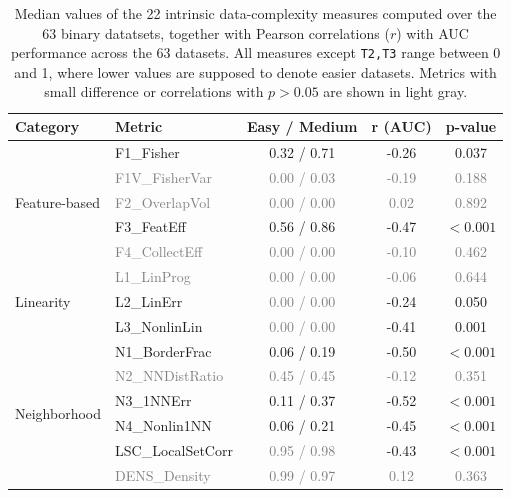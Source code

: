 \documentclass[preprint,12pt,authoryear]{elsarticle}
\begin{document}
\begin{table}[h!]
\centering
\caption{Median values of the 22 intrinsic data-complexity measures computed over the 63 binary datatsets, together with Pearson correlations ($r$) with AUC performance across the 63 datasets. 
All measures except \texttt{T2,T3} range between 0 and 1, where lower values are supposed to denote easier datasets. 
Metrics with small difference or correlations with $p > 0.05$ are shown in light gray.}
\label{tab:intrinsic_metrics_corr_preferred}
\small
\begin{tabular}{llccc}
\toprule
\textbf{Category} & \textbf{Metric} & \textbf{Easy / Medium} & \textbf{r (AUC)} & \textbf{p-value} \\
\midrule
\multirow{5}{*}{Feature-based}
 & F1\_Fisher & 0.32 / 0.71 & -0.26 & 0.037 \\
 & \textcolor{gray}{F1V\_FisherVar} & \textcolor{gray}{0.00 / 0.03} & \textcolor{gray}{-0.19} & \textcolor{gray}{0.188} \\
 & \textcolor{gray}{F2\_OverlapVol} & \textcolor{gray}{0.00 / 0.00} & \textcolor{gray}{0.02} & \textcolor{gray}{0.892} \\
 & F3\_FeatEff & 0.56 / 0.86 & -0.47 & $<0.001$ \\
 & \textcolor{gray}{F4\_CollectEff} & \textcolor{gray}{0.00 / 0.00} & \textcolor{gray}{-0.10} & \textcolor{gray}{0.462} \\
\midrule
\multirow{3}{*}{Linearity}
 & \textcolor{gray}{L1\_LinProg} & \textcolor{gray}{0.00 / 0.00} & \textcolor{gray}{-0.06} & \textcolor{gray}{0.644} \\
 & L2\_LinErr & \textcolor{gray}{0.00 / 0.00} & -0.24 & 0.050 \\
 & L3\_NonlinLin &  \textcolor{gray}{0.00 / 0.00} & -0.41 & 0.001 \\
\midrule
\multirow{6}{*}{Neighborhood}
 & N1\_BorderFrac & 0.06 / 0.19 & -0.50 & $<0.001$ \\
 & \textcolor{gray}{N2\_NNDistRatio} & \textcolor{gray}{0.45 / 0.45} & \textcolor{gray}{-0.12} & \textcolor{gray}{0.351} \\
 & N3\_1NNErr & 0.11 / 0.37 & -0.52 & $<0.001$ \\
 & N4\_Nonlin1NN & 0.06 / 0.21 & -0.45 &$<0.001$ \\
  & LSC\_LocalSetCorr &  \textcolor{gray}{0.95 / 0.98} & -0.43 & $<0.001$ \\
\midrule
\multirow{3}{*}{Network}
 & \textcolor{gray}{DENS\_Density} & \textcolor{gray}{0.99 / 0.97} & \textcolor{gray}{0.12} & \textcolor{gray}{0.363} \\

\end{tabular}
\end{table}
\end{document}
